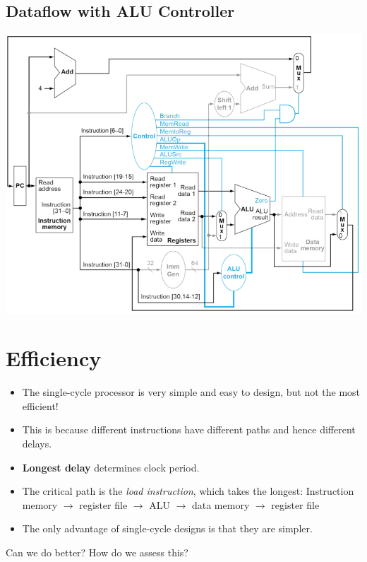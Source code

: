 \documentclass[10pt]{article}
\begin{document}
\subsection*{Dataflow with ALU Controller}
\begin{center}
    \includegraphics*[scale=0.75]{W2_13.png}
\end{center}

\section*{Efficiency}
\begin{itemize}
    \item The single-cycle processor is very simple and easy to design, but not the most efficient!  
    \item This is because different instructions have different paths and hence different delays.
    \item \textbf{Longest delay} determines clock period.
    \item The critical path is the \textit{load instruction}, which takes the longest: Instruction memory $\rightarrow$ register file $\rightarrow$ ALU $\rightarrow$ data memory $\rightarrow$ register file
    \item The only advantage of single-cycle designs is that they are simpler.
\end{itemize}
Can we do better?  How do we assess this?\\
\end{document}
